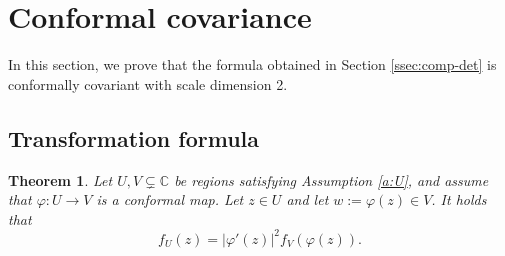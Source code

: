 \documentclass[11pt]{article}
\newtheorem{theorem}{Theorem}[section]
\theoremstyle{remark}
\newcommand{\eqnst}[1]{\begin{equation*}#1\end{equation*}}
\begin{document}
\section{Conformal covariance}
\label{sec:conformal}

In this section, we prove that the formula obtained in Section \ref{ssec:comp-det} is 
conformally covariant with scale dimension 2. 


\subsection{Transformation formula}
\label{ssec:conf}

\begin{theorem}
\label{thm3_6}
    Let \(U, V \subsetneq \mathbb{C}\) be regions satisfying Assumption \ref{a:U}, and assume that
    $\varphi : U \to V$ is a conformal map. Let $z \in U$ and let $w := \varphi(z) \in V$. 
It holds that 
\eqnst{
 f_U(z)
 = |\varphi'(z)|^2 f_V(\varphi(z)). }
\end{theorem}
\end{document}
